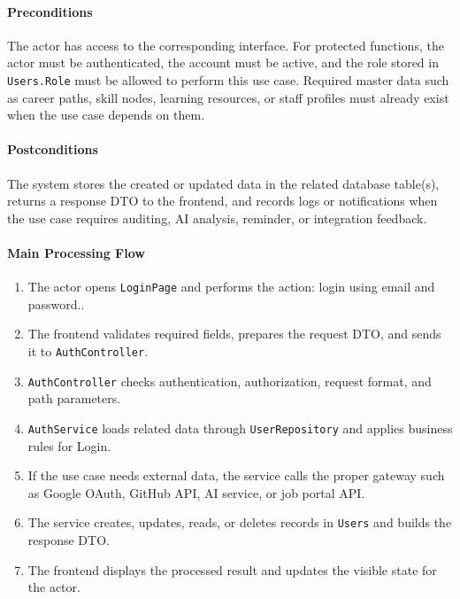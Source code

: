 \paragraph{Preconditions}

The actor has access to the corresponding interface. For protected functions, the actor must be authenticated, the account must be active, and the role stored in \texttt{Users.Role} must be allowed to perform this use case. Required master data such as career paths, skill nodes, learning resources, or staff profiles must already exist when the use case depends on them.

\paragraph{Postconditions}

The system stores the created or updated data in the related database table(s), returns a response DTO to the frontend, and records logs or notifications when the use case requires auditing, AI analysis, reminder, or integration feedback.

\paragraph{Main Processing Flow}

\begin{enumerate}
    \item The actor opens \texttt{LoginPage} and performs the action: login using email and password..
    \item The frontend validates required fields, prepares the request DTO, and sends it to \texttt{AuthController}.
    \item \texttt{AuthController} checks authentication, authorization, request format, and path parameters.
    \item \texttt{AuthService} loads related data through \texttt{UserRepository} and applies business rules for Login.
    \item If the use case needs external data, the service calls the proper gateway such as Google OAuth, GitHub API, AI service, or job portal API.
    \item The service creates, updates, reads, or deletes records in \texttt{Users} and builds the response DTO.
    \item The frontend displays the processed result and updates the visible state for the actor.
\end{enumerate}

